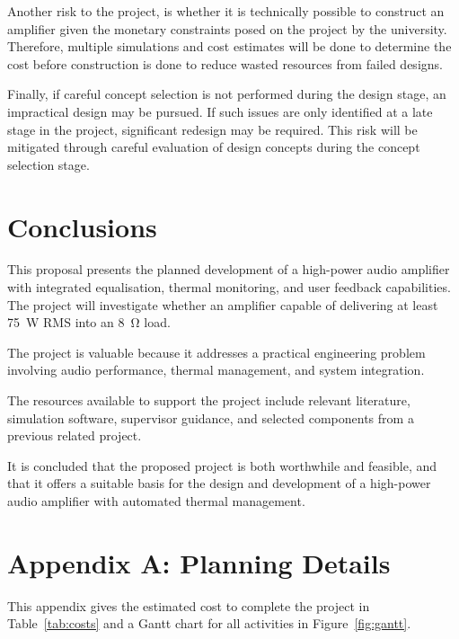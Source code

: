 \documentclass[12pt,a4paper]{report}
\begin{document}
	Another risk to the project, is whether it is technically possible to construct an amplifier given the monetary constraints posed on the project by the university. Therefore, multiple simulations and cost estimates will be done to determine the cost before construction is done to reduce wasted resources from failed designs.
	
	Finally, if careful concept selection is not performed during the design stage, an impractical design may be pursued. If such issues are only identified at a late stage in the project, significant redesign may be required. This risk will be mitigated through careful evaluation of design concepts during the concept selection stage.
	
	\section{Conclusions}
	
	This proposal presents the planned development of a high-power audio amplifier with integrated equalisation, thermal monitoring, and user feedback capabilities. The project will investigate whether an amplifier capable of delivering at least \SI{75}{\watt} RMS into an \SI{8}{\ohm} load.
	
	The project is valuable because it addresses a practical engineering problem involving audio performance, thermal management, and system integration.
	
	The resources available to support the project include relevant literature, simulation software, supervisor guidance, and selected components from a previous related project.
	
	It is concluded that the proposed project is both worthwhile and feasible, and that it offers a suitable basis for the design and development of a high-power audio amplifier with automated thermal management.
	
	\appendix
	
	\section*{Appendix A: Planning Details}
	
	This appendix gives the estimated cost to complete the project in Table~\ref{tab:costs} and a Gantt chart for all activities in Figure~\ref{fig:gantt}.
	
\end{document}

